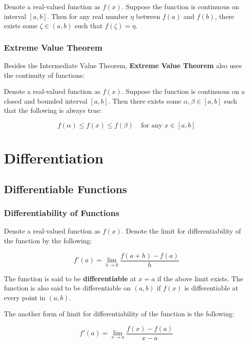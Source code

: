 \begin{thm}
  Denote a real-valued function as $f(x)$. Suppose the function is continuous on interval $[a,b]$. Then for any real number $\eta$ between $f(a)$ and $f(b)$, there exists some $\zeta\in (a,b)$ such that $f(\zeta)=\eta$.
\end{thm}

\subsubsection{Extreme Value Theorem}
Besides the Intermediate Value Theorem, \textbf{Extreme Value Theorem} also uses the continuity of functions:\n

\begin{thm}
  Denote a real-valued function as $f(x)$. Suppose the function is continuous on a closed and bounded interval $[a,b]$. Then there exists some $\alpha,\beta\in [a,b]$ such that the following is always true:

  $$f(\alpha)\leq f(x)\leq f(\beta)\;\;\;\;\text{for any }x\in [a,b]$$

\end{thm}

\pagebreak

\section{Differentiation}
\subsection{Differentiable Functions}
\subsubsection{Differentiability of Functions}
\begin{dft}
  Denote a real-valued function as $f(x)$. Denote the limit for differentiability of the function by the following:

  $$f'(a)=\lim_{h\to 0}\frac{f(a+h)-f(a)}{h}$$\s

  The function is said to be \textbf{differentiable} at $x=a$ if the above limit exists. The function is also said to be differentiable on $(a,b)$ if $f(x)$ is differentiable at every point in $(a,b)$.\n

  The another form of limit for differentiability of the function is the following:

  $$f'(a)=\lim_{x\to a}\frac{f(x)-f(a)}{x-a}$$
\end{dft}

